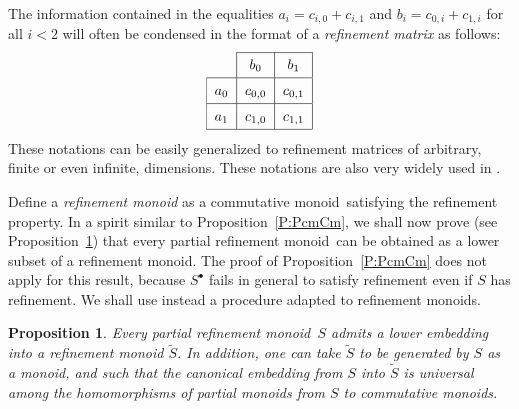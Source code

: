 \documentclass[psamsfonts,reqno]{memo-l}
\theoremstyle{plain}
\newtheorem{proposition}[lemma]{Proposition}
\theoremstyle{definition}
\theoremstyle{remark}
\numberwithin{equation}{section}
\newcommand{\Sbul}{S^{\bullet}}
\newcommand{\Ref}[1]{\widetilde{#1}}
\newcommand{\tvi}{\vrule height 12pt depth 6pt width 0pt}
\newcommand{\cm}{commutative mon\-oid}
\newcommand{\prm}{partial refinement mon\-oid}
\begin{document}
The information contained in the equalities $a_i=c_{i,0}+c_{i,1}$ and
$b_i=c_{0,i}+c_{1,i}$ for all $i<2$ will often be condensed in the format of
a \emph{refinement matrix} as follows:
   \[
   \begin{tabular}{|c|c|c|}
   \cline{2-3}
   \multicolumn{1}{l|}{} & $b_0$ & $b_1$\tvi\\
   \hline
   $a_0$ & $c_{0,0}$ & $c_{0,1}$\tvi\\
   \hline
   $a_1$ & $c_{1,0}$ & $c_{1,1}$\tvi\\
   \hline
   \end{tabular}
   \]
These notations can be easily generalized to refinement matrices of
arbitrary, finite or even infinite, dimensions.
These notations are also very widely used in \cite{WDim}.

Define a \emph{refinement monoid} as a
\cm\ satisfying the refinement property. In a spirit similar to
Proposition~\ref{P:PcmCm}, we shall now prove (see
Proposition~\ref{P:PrmRm}) that every
\prm\ can be obtained as a lower subset of a refinement monoid. The proof of
Proposition~\ref{P:PcmCm} does not apply for this result, because
$\Sbul$ fails in general to satisfy refinement even if $S$ has refinement. We
shall use instead a procedure adapted to refinement monoids.

\begin{proposition}\label{P:PrmRm}
Every \prm\ $S$ admits a lower embedding into a
refinement monoid\index{SzzRef@$\Ref S$|ii} $\Ref S$. In addition, one can
take $\Ref S$ to be generated by $S$ as a monoid, and such that the canonical
embedding from $S$ into $\Ref S$ is universal among the homomorphisms of
partial monoids from $S$ to \cm s.
\end{proposition}
\end{document}
